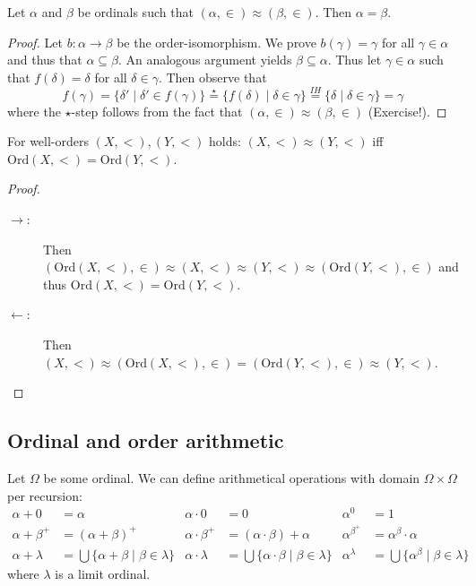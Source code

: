 \documentclass{whrartcl}
\newcommand{\ord}{\text{Ord}}
\begin{document}
\begin{proposition}
  Let $\alpha$ and $\beta$ be ordinals such that $(\alpha, \in) \approx (\beta,
  \in)$. Then $\alpha = \beta$.
\end{proposition}
\begin{proof}
  Let $b : \alpha \to \beta$ be the order-isomorphism. We prove $b(\gamma) =
  \gamma$ for all $\gamma \in \alpha$ and thus that $\alpha \subseteq \beta$. An
  analogous argument yields $\beta \subseteq \alpha$.
  Thus let $\gamma \in \alpha$ such that $f(\delta) = \delta$ for all $\delta
  \in \gamma$. Then observe that
  \[
    f(\gamma) = \{\delta' \mid \delta' \in f(\gamma)\} \stackrel{\star}{=}
    \{f(\delta) \mid \delta \in \gamma\} \stackrel{IH}{=} \{\delta \mid \delta \in \gamma\} = \gamma
  \]
  where the $\star$-step follows from the fact that $(\alpha, \in) \approx
  (\beta, \in)$ (Exercise!).
\end{proof}

\begin{corollary}
  For well-orders $(X, <), (Y, <)$ holds: $(X, <) \approx (Y, <)$ iff $\ord(X,
  <) = \ord(Y, <)$.
\end{corollary}
\begin{proof}
  \
  \begin{description}
  \item[$\to$:] Then $(\ord(X, <), \in) \approx (X, <) \approx (Y, <) \approx
    (\ord(Y, <), \in)$ and thus $\ord(X, <) = \ord(Y, <)$.
  \item[$\leftarrow$:] Then $(X, <) \approx (\ord(X, <), \in) = (\ord(Y, <),
    \in) \approx (Y, <)$.
  \end{description}
\end{proof}

\subsection{Ordinal and order arithmetic}

\begin{definition}
  Let $\Omega$ be some ordinal. We can define arithmetical operations with
  domain $\Omega \times \Omega$ per recursion:
  \begin{align*}
    \alpha + 0 &= \alpha & \alpha \cdot 0 &= 0 & \alpha^0 &= 1 \\
    \alpha + \beta^+ &= (\alpha + \beta)^+ & \alpha \cdot \beta^+ &= (\alpha \cdot \beta) + \alpha & \alpha^{\beta^+} & = \alpha^\beta \cdot \alpha \\
    \alpha + \lambda &= \bigcup \{\alpha + \beta \mid \beta \in \lambda\} & \alpha \cdot \lambda &= \bigcup \{\alpha \cdot \beta \mid \beta \in \lambda\} & \alpha^\lambda & = \bigcup \{\alpha^\beta \mid \beta \in \lambda\}
  \end{align*}
  where $\lambda$ is a limit ordinal.
\end{definition}
\end{document}
